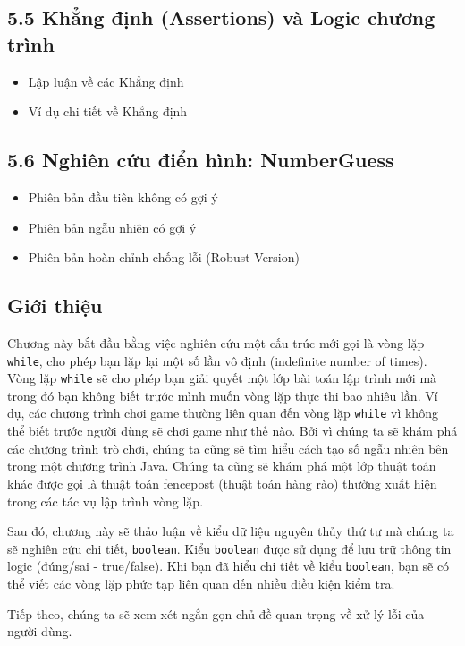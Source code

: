 \subsection*{5.5 Khẳng định (Assertions) và Logic chương trình}
\begin{itemize}
    \item Lập luận về các Khẳng định
    \item Ví dụ chi tiết về Khẳng định
\end{itemize}

\subsection*{5.6 Nghiên cứu điển hình: NumberGuess}
\begin{itemize}
    \item Phiên bản đầu tiên không có gợi ý
    \item Phiên bản ngẫu nhiên có gợi ý
    \item Phiên bản hoàn chỉnh chống lỗi (Robust Version)
\end{itemize}

\subsection*{Giới thiệu}
Chương này bắt đầu bằng việc nghiên cứu một cấu trúc mới gọi là vòng lặp \texttt{while}, cho phép bạn lặp lại một số lần vô định (indefinite number of times). Vòng lặp \texttt{while} sẽ cho phép bạn giải quyết một lớp bài toán lập trình mới mà trong đó bạn không biết trước mình muốn vòng lặp thực thi bao nhiêu lần. Ví dụ, các chương trình chơi game thường liên quan đến vòng lặp \texttt{while} vì không thể biết trước người dùng sẽ chơi game như thế nào. Bởi vì chúng ta sẽ khám phá các chương trình trò chơi, chúng ta cũng sẽ tìm hiểu cách tạo số ngẫu nhiên bên trong một chương trình Java. Chúng ta cũng sẽ khám phá một lớp thuật toán khác được gọi là thuật toán fencepost (thuật toán hàng rào) thường xuất hiện trong các tác vụ lập trình vòng lặp.

Sau đó, chương này sẽ thảo luận về kiểu dữ liệu nguyên thủy thứ tư mà chúng ta sẽ nghiên cứu chi tiết, \texttt{boolean}. Kiểu \texttt{boolean} được sử dụng để lưu trữ thông tin logic (đúng/sai - true/false). Khi bạn đã hiểu chi tiết về kiểu \texttt{boolean}, bạn sẽ có thể viết các vòng lặp phức tạp liên quan đến nhiều điều kiện kiểm tra.

Tiếp theo, chúng ta sẽ xem xét ngắn gọn chủ đề quan trọng về xử lý lỗi của người dùng.

